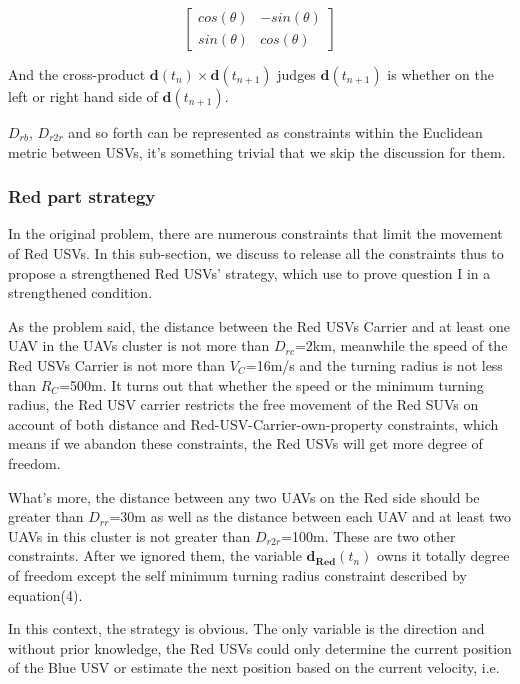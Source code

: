 \documentclass{mcmthesis}
\begin{document}
\begin{equation}
\left[
 \begin{matrix}
   cos(\theta) & -sin(\theta) \\
   sin(\theta) & cos(\theta)
  \end{matrix}
  \right] \tag{3}
\end{equation}

And the cross-product $\mathbf{d}(t_{n}) \times \mathbf{d}(t_{n+1})$ judges $\mathbf{d}(t_{n+1})$ is whether on the left or right hand side of $\mathbf{d}(t_{n+1})$.

$D_{rb}$, $D_{r2r}$ and so forth can be represented as constraints within the Euclidean metric between USVs, it's something trivial that we skip the discussion for them.

\subsubsection{Red part strategy}
In the original problem, there are numerous constraints that limit the movement of Red USVs. In this sub-section, we discuss to release all the constraints thus to propose a strengthened Red USVs' strategy, which use to prove question I in a strengthened condition. \par

As the problem said, the distance between the Red USVs Carrier and at least one UAV in the UAVs cluster is not more than $D_{rc}$=2km, meanwhile the speed of the Red USVs Carrier is not more than $V_C$=16m/s and the turning radius is not less than $R_{C}$=500m. It turns out that whether the speed or the minimum turning radius, the Red USV carrier restricts the free movement of the Red SUVs on account of both distance and Red-USV-Carrier-own-property constraints, which means if we abandon these constraints, the Red USVs will get more degree of freedom. \par

What's more, the distance between any two UAVs on the Red side should be greater than $D_{rr}$=30m as well as the distance between each UAV and at least two UAVs in this cluster is not greater than $D_{r2r}$=100m. These are two other constraints. After we ignored them, the variable $\mathbf{d_{Red}}(t_{n})$ owns it totally degree of freedom except the self minimum turning radius constraint described by equation(4). \par

In this context, the strategy is obvious. The only variable is the direction and without prior knowledge, the Red USVs could only determine the current position of the Blue USV or estimate the next position based on the current velocity, i.e.
\end{document}
